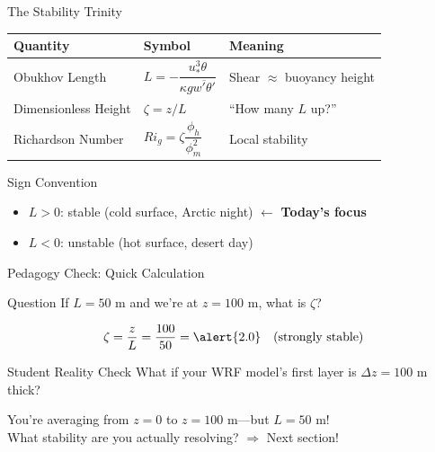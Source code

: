 \documentclass[10pt,aspectratio=169]{beamer}
\begin{document}
\begin{frame}{The Stability Trinity}
  \begin{table}
    \centering
    \begin{tabular}{lll}
      \toprule
      \textbf{Quantity} & \textbf{Symbol} & \textbf{Meaning} \\
      \midrule
      Obukhov Length & $L = -\dfrac{u_*^3 \theta}{\kappa g \overline{w'\theta'}}$ & Shear $\approx$ buoyancy height \\[0.3cm]
      Dimensionless Height & $\zeta = z/L$ & ``How many $L$ up?'' \\[0.3cm]
      Richardson Number & $Ri_g = \zeta \dfrac{\phi_h}{\phi_m^2}$ & Local stability \\
      \bottomrule
    \end{tabular}
  \end{table}
  
  \pause
  \vspace{0.3cm}
  \begin{alertblock}{Sign Convention}
    \begin{itemize}
      \item $L > 0$: \alert{stable} (cold surface, Arctic night) $\leftarrow$ \textbf{Today's focus}
      \item $L < 0$: unstable (hot surface, desert day)
    \end{itemize}
  \end{alertblock}
\end{frame}

\begin{frame}{Pedagogy Check: Quick Calculation}
  \begin{exampleblock}{Question}
    If $L = 50$ m and we're at $z = 100$ m, what is $\zeta$?
  \end{exampleblock}
  
  \pause
  \[
  \zeta = \frac{z}{L} = \frac{100}{50} = \alert{2.0} \quad \text{(strongly stable)}
  \]
  
  \pause
  \vspace{0.5cm}
  \begin{alertblock}{Student Reality Check}
    What if your WRF model's \alert{first layer is $\Delta z = 100$ m thick}?
    
    \centering
    You're averaging from $z=0$ to $z=100$ m—but $L=50$ m!\\
    \alert{What stability are you actually resolving?} $\Rightarrow$ Next section!
  \end{alertblock}
\end{frame}
\end{document}
